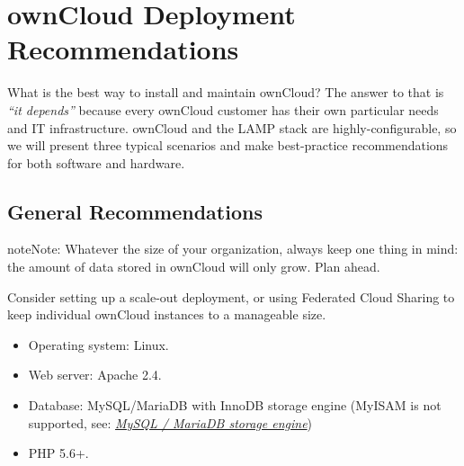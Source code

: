 \documentclass[letterpaper,10pt,english]{sphinxmanual}
\begin{document}
\section{ownCloud Deployment Recommendations}
\label{installation/deployment_recommendations::doc}\label{installation/deployment_recommendations:owncloud-deployment-recommendations}
What is the best way to install and maintain ownCloud? The answer to that is
\emph{``it depends''} because every ownCloud customer has their own
particular needs and IT infrastructure. ownCloud and the LAMP stack are
highly-configurable, so we will present three typical scenarios and make
best-practice recommendations for both software and hardware.


\subsection{General Recommendations}
\label{installation/deployment_recommendations:general-recommendations}
\begin{notice}{note}{Note:}
Whatever the size of your organization, always keep one thing in mind:
the amount of data stored in ownCloud will only grow. Plan ahead.
\end{notice}

Consider setting up a scale-out deployment, or using Federated Cloud Sharing to
keep individual ownCloud instances to a manageable size.
\begin{itemize}
\item {} 
Operating system: Linux.

\item {} 
Web server: Apache 2.4.

\item {} 
Database: MySQL/MariaDB with InnoDB storage engine (MyISAM is not supported, see: {\hyperref[configuration_database/linux_database_configuration:db-storage-engine-label]{\emph{MySQL / MariaDB storage engine}}})

\item {} 
PHP 5.6+.

\end{itemize}
\end{document}
